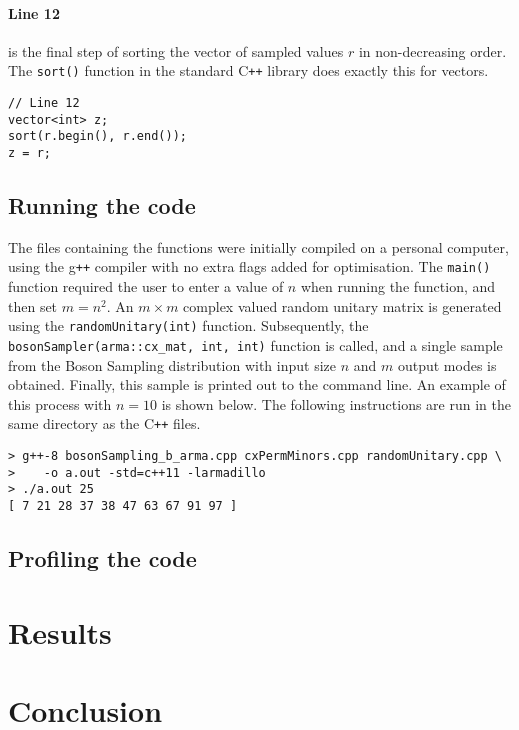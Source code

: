 \documentclass[11pt]{article}
\theoremstyle{theorem}
\theoremstyle{theorem}
\theoremstyle{remark}
\theoremstyle{note}
\theoremstyle{plain}
\theoremstyle{definition}
\begin{document}
\paragraph{Line 12} is the final step of sorting the vector of sampled values $r$ in non-decreasing order. The \texttt{sort()} function in the standard C\texttt{++} library does exactly this for vectors.
\begin{verbatim}
// Line 12
vector<int> z;
sort(r.begin(), r.end());
z = r;
\end{verbatim}

\subsection{Running the code}
The files containing the functions were initially compiled on a personal computer, using the g\texttt{++} compiler with no extra flags added for optimisation. The \texttt{main()} function required the user to enter a value of $n$ when running the function, and then set $m = n^2$. An $m \times m$ complex valued random unitary matrix is generated using the \texttt{randomUnitary(int)} function. Subsequently, the \texttt{bosonSampler(arma::cx_mat, int, int)} function is called, and a single sample from the Boson Sampling distribution with input size $n$ and $m$ output modes is obtained. Finally, this sample is printed out to the command line. An example of this process with $n = 10$ is shown below. The following instructions are run in the same directory as the C\texttt{++} files.
\begin{verbatim}
> g++-8 bosonSampling_b_arma.cpp cxPermMinors.cpp randomUnitary.cpp \
>	 -o a.out -std=c++11 -larmadillo
> ./a.out 25
[ 7 21 28 37 38 47 63 67 91 97 ]
\end{verbatim}

\subsection{Profiling the code}

\section{Results}

\section{Conclusion}



\end{document}
